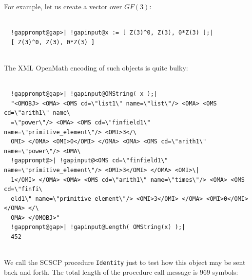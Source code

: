 \documentclass[a4paper,11pt]{report}
\begin{document}
{{ For example, let us create a vector over $GF(3)$: 
\begin{Verbatim}[commandchars=!@|,fontsize=\small,frame=single,label=Example]
  
  !gapprompt@gap>| !gapinput@x := [ Z(3)^0, Z(3), 0*Z(3) ];|
  [ Z(3)^0, Z(3), 0*Z(3) ]
  
\end{Verbatim}
 The XML \textsf{OpenMath} encoding of such objects is quite bulky: 
\begin{Verbatim}[commandchars=!@|,fontsize=\small,frame=single,label=Example]
  
  !gapprompt@gap>| !gapinput@OMString( x );|
  "<OMOBJ> <OMA> <OMS cd=\"list1\" name=\"list\"/> <OMA> <OMS cd=\"arith1\" name\
  =\"power\"/> <OMA> <OMS cd=\"finfield1\" name=\"primitive_element\"/> <OMI>3</\
  OMI> </OMA> <OMI>0</OMI> </OMA> <OMA> <OMS cd=\"arith1\" name=\"power\"/> <OMA\
  !gapprompt@>| !gapinput@<OMS cd=\"finfield1\" name=\"primitive_element\"/> <OMI>3</OMI> </OMA> <OMI>\|
  1</OMI> </OMA> <OMA> <OMS cd=\"arith1\" name=\"times\"/> <OMA> <OMS cd=\"finfi\
  eld1\" name=\"primitive_element\"/> <OMI>3</OMI> </OMA> <OMI>0</OMI> </OMA> </\
  OMA> </OMOBJ>"
  !gapprompt@gap>| !gapinput@Length( OMString(x) );|
  452
  
\end{Verbatim}
 We call the \textsf{SCSCP} procedure \texttt{Identity} just to test how this object may be sent back and forth. The total length of
the procedure call message is 969 symbols: 
\begin{Verbatim}[commandchars=!@|,fontsize=\small,frame=single,label=Example]
  

\end{Verbatim}}}
\end{document}
